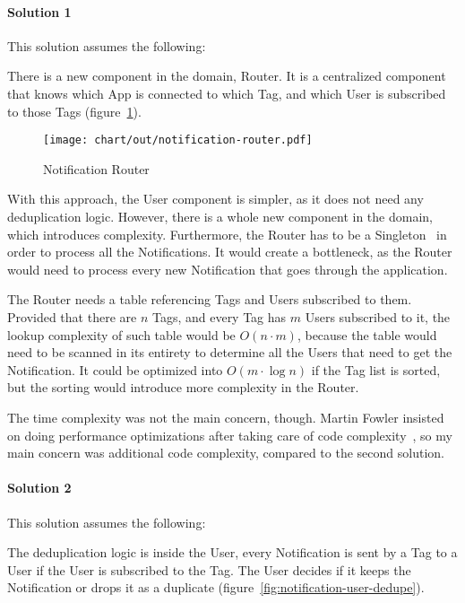 \paragraph*{Solution 1}\label{par:duplication-solution-1}

This solution assumes the following:

There is a new component in the domain, Router.
It is a centralized component
that knows which App is connected to which Tag,
and which User is subscribed to those Tags
(figure~\ref{fig:notification-router}).

\begin{figure}[h]
  \centering
  \texttt{[image: chart/out/notification-router.pdf]}
  \caption{Notification Router}
  \label{fig:notification-router}
\end{figure}

With this approach,
the User component is simpler,
as it does not need any deduplication logic.
However, there is a whole new component
in the domain, which introduces complexity.
Furthermore, the Router has to be
a Singleton~\cite{gamma_design_1994}
in order to process all the Notifications.
It would create a bottleneck,
as the Router would need to process every new Notification
that goes through the application.

The Router needs a table referencing
Tags and Users subscribed to them.
Provided that there are $n$ Tags,
and every Tag has $m$ Users subscribed to it,
the lookup complexity of such table
would be $O(n \cdot m)$,
because the table would need to be
scanned in its entirety to determine
all the Users that need to get the Notification.
It could be optimized into $O(m \cdot \log n)$
if the Tag list is sorted,
but the sorting would introduce
more complexity in the Router.

The time complexity was not the main concern, though.
Martin Fowler insisted on doing performance optimizations
after taking care of code complexity~\cite{fowler_refactoring_2019},
so my main concern was additional code complexity,
compared to the second solution.

\paragraph*{Solution 2}\label{par:duplication-solution-2}

This solution assumes the following:

The deduplication logic is inside the User,
every Notification is sent by a Tag to a User
if the User is subscribed to the Tag.
The User decides if it keeps the Notification
or drops it as a duplicate
(figure~\ref{fig:notification-user-dedupe}).

